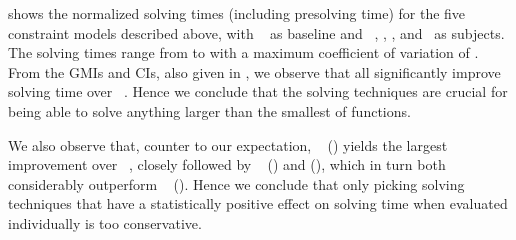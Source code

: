 shows the normalized solving
times (including \gls{presolving} time) for the five \glspl{constraint model}
described above, with ~\modelA{} as \gls{baseline}
and ~\modelB, \modelC, \modelD, and~\modelE{} as
\glspl{subject}.
%
The solving times range from
\printMinSolvingTime{
  \SolvTechEnableOnlyAllGoodPrePlusSolvingTimeSpeedupNonePrePlusSolvingTimeAvgMin,
  \SolvTechEnableOnlyAllGoodPrePlusSolvingTimeSpeedupPrePlusSolvingTimeAvgMin,
  \SolvTechDisableAllBadPrePlusSolvingTimeSpeedupPrePlusSolvingTimeAvgMin,
  \SolvTechDisableAllPrePlusSolvingTimeSpeedupPrePlusSolvingTimeAvgMin,
  \SolvTechBestCombosPrePlusSolvingTimeSpeedupPrePlusSolvingTimeAvgMin
} to
\printMaxSolvingTime{
  \SolvTechEnableOnlyAllGoodPrePlusSolvingTimeSpeedupNonePrePlusSolvingTimeAvgMax,
  \SolvTechEnableOnlyAllGoodPrePlusSolvingTimeSpeedupPrePlusSolvingTimeAvgMax,
  \SolvTechDisableAllBadPrePlusSolvingTimeSpeedupPrePlusSolvingTimeAvgMax,
  \SolvTechDisableAllPrePlusSolvingTimeSpeedupPrePlusSolvingTimeAvgMax,
  \SolvTechBestCombosPrePlusSolvingTimeSpeedupPrePlusSolvingTimeAvgMax
} with a maximum coefficient of variation of
\numMaxOf{
  \SolvTechEnableOnlyAllGoodPrePlusSolvingTimeSpeedupNonePrePlusSolvingTimeCvMax,
  \SolvTechEnableOnlyAllGoodPrePlusSolvingTimeSpeedupPrePlusSolvingTimeCvMax,
  \SolvTechDisableAllBadPrePlusSolvingTimeSpeedupPrePlusSolvingTimeCvMax,
  \SolvTechDisableAllPrePlusSolvingTimeSpeedupPrePlusSolvingTimeCvMax,
  \SolvTechBestCombosPrePlusSolvingTimeSpeedupPrePlusSolvingTimeCvMax
}.
%
From the \glspl{GMI} and \glspl{CI}, also given in
, we observe that all
 significantly improve solving time over
~\modelA.
%
Hence we conclude that the solving techniques are crucial for being able to
solve anything larger than the smallest of \glspl{function}.

We also observe that, counter to our expectation, ~\modelC{} () yields the largest
improvement over ~\modelA, closely followed by
~\modelD{} () and
\modelE{} (), which in turn both considerably
outperform ~\modelB{}
().
%
Hence we conclude that only picking solving techniques that have a statistically
positive effect on solving time when evaluated individually is too conservative.

